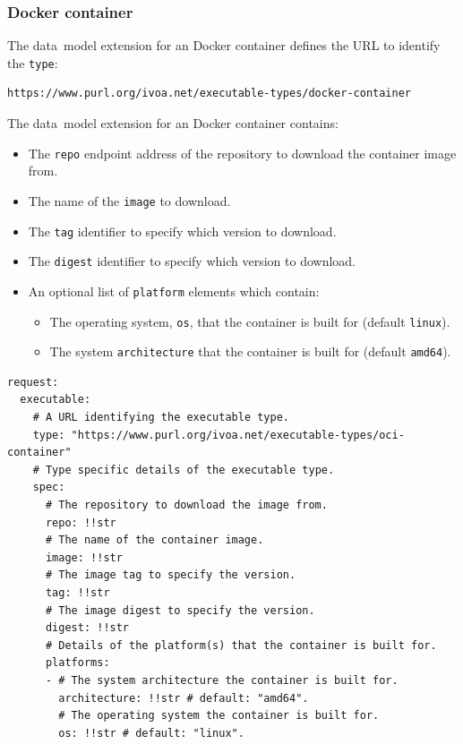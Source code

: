 \documentclass[11pt,a4paper]{ivoa}
\newcommand{\datamodel} {data~model}
\newcommand{\dockercontainer} {Docker container}
\newcommand{\codeword}[1] {\texttt{#1}}
\begin{document}
\subsubsection{Docker container}
\label{datamodel-docker-container}

The \datamodel{} extension for an \dockercontainer{} defines the URL
to identify the \codeword{type}:
\begin{lstlisting}[]
https://www.purl.org/ivoa.net/executable-types/docker-container
\end{lstlisting}
\hfill \break
The \datamodel{} extension for an \dockercontainer{} contains:
\begin{itemize}
    \item The \codeword{repo} endpoint address of the repository to download the container image from.
    \item The name of the \codeword{image} to download.
    \item The \codeword{tag} identifier to specify which version to download.
    \item The \codeword{digest} identifier to specify which version to download.
    \item An optional list of \codeword{platform} elements which contain:
    \begin{itemize}
        \item The operating system, \codeword{os}, that the container is built for (default \codeword{linux}).
        \item The system \codeword{architecture} that the container is built for (default \codeword{amd64}).
    \end{itemize}


\end{itemize}

\begin{lstlisting}[]
request:
  executable:
    # A URL identifying the executable type.
    type: "https://www.purl.org/ivoa.net/executable-types/oci-container"
    # Type specific details of the executable type.
    spec:
      # The repository to download the image from.
      repo: !!str
      # The name of the container image.
      image: !!str
      # The image tag to specify the version.
      tag: !!str
      # The image digest to specify the version.
      digest: !!str
      # Details of the platform(s) that the container is built for.
      platforms:
      - # The system architecture the container is built for.
        architecture: !!str # default: "amd64".
        # The operating system the container is built for.
        os: !!str # default: "linux".
\end{lstlisting}
\end{document}
